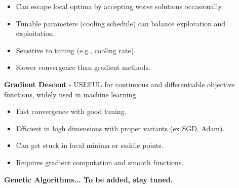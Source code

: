 \documentclass{article}
\begin{document}
    \begin{itemize}[label=]
        \item Can escape local optima by accepting worse solutions occasionally.
        \item Tunable parameters (cooling schedule) can balance exploration and exploitation.
    \end{itemize}
    \begin{itemize}[label=]
        \item Sensitive to tuning (e.g., cooling rate).
        \item Slower convergence than gradient methods.
    \end{itemize}

    \textbf{Gradient Descent} - USEFUL for continuous and differentiable objective functions, widely used in machine learning.

    \begin{itemize}[label=]
        \item Fast convergence with good tuning.
        \item Efficient in high dimensions with proper variants (ex SGD, Adam).
    \end{itemize}
    \begin{itemize}[label=]
        \item Can get stuck in local minima or saddle points.
        \item Requires gradient computation and smooth functions.
    \end{itemize}

    \textbf{Genetic Algorithms... To be added, stay tuned.}
\end{document}
